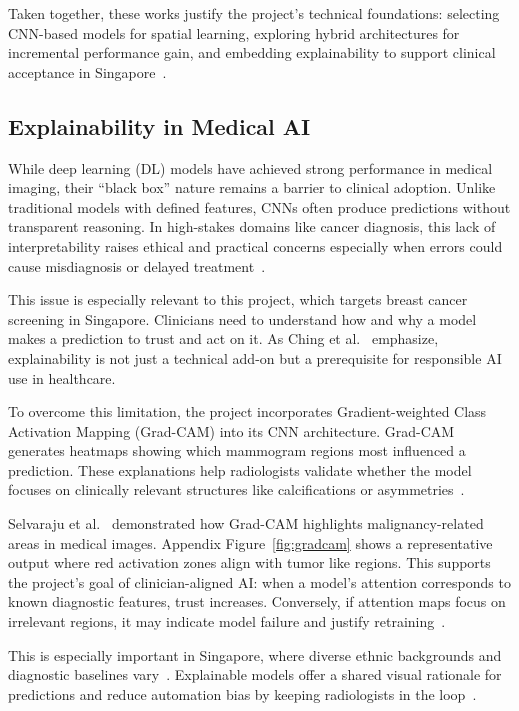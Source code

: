 \documentclass[12pt]{article}
\begin{document}
Taken together, these works justify the project’s technical foundations: selecting CNN-based models for spatial learning, exploring hybrid architectures for incremental performance gain, and embedding explainability to support clinical acceptance in Singapore~\cite{1,6,7}.

\subsection{Explainability in Medical AI}

While deep learning (DL) models have achieved strong performance in medical imaging, their “black box” nature remains a barrier to clinical adoption. Unlike traditional models with defined features, CNNs often produce predictions without transparent reasoning. In high-stakes domains like cancer diagnosis, this lack of interpretability raises ethical and practical concerns especially when errors could cause misdiagnosis or delayed treatment~\cite{3}.

This issue is especially relevant to this project, which targets breast cancer screening in Singapore. Clinicians need to understand how and why a model makes a prediction to trust and act on it. As Ching et al.~\cite{3} emphasize, explainability is not just a technical add-on but a prerequisite for responsible AI use in healthcare.

To overcome this limitation, the project incorporates Gradient-weighted Class Activation Mapping (Grad-CAM) into its CNN architecture. Grad-CAM generates heatmaps showing which mammogram regions most influenced a prediction. These explanations help radiologists validate whether the model focuses on clinically relevant structures like calcifications or asymmetries~\cite{5}.

Selvaraju et al.~\cite{5} demonstrated how Grad-CAM highlights malignancy-related areas in medical images. Appendix Figure~\ref{fig:gradcam} shows a representative output where red activation zones align with tumor like regions. This supports the project’s goal of clinician-aligned AI: when a model’s attention corresponds to known diagnostic features, trust increases. Conversely, if attention maps focus on irrelevant regions, it may indicate model failure and justify retraining~\cite{5}.

This is especially important in Singapore, where diverse ethnic backgrounds and diagnostic baselines vary~\cite{6}. Explainable models offer a shared visual rationale for predictions and reduce automation bias by keeping radiologists in the loop~\cite{3}.
\end{document}
